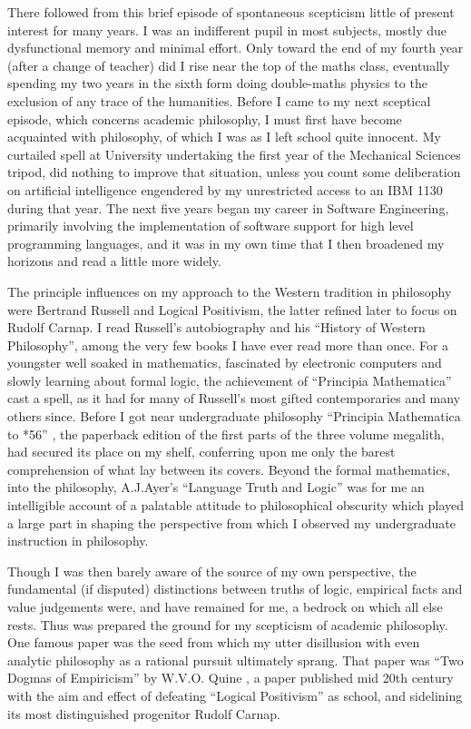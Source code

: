 \documentclass[10pt,titlepage]{book}
\begin{document}
There followed from this brief episode of spontaneous scepticism little of present interest for many years.
I was an indifferent pupil in most subjects, mostly due dysfunctional memory and minimal effort.
Only toward the end of my fourth year (after a change of teacher) did I rise near the top of the maths class, eventually spending my two years in the sixth form doing double-maths physics to the exclusion of any trace of the humanities.
Before I came to my next sceptical episode, which concerns academic philosophy, I must first have become acquainted with philosophy, of which I was as I left school quite innocent.
My curtailed spell at University undertaking the first year of the Mechanical Sciences tripod, did nothing to improve that situation, unless you count some deliberation on artificial intelligence engendered by my unrestricted access to an IBM 1130 during that year.
The next five years began my career in Software Engineering, primarily involving the implementation of software support for high level programming languages, and it was in my own time that I then broadened my horizons and read a little more widely.

The principle influences on my approach to the Western tradition in philosophy were Bertrand Russell and Logical Positivism, the latter refined later to focus on Rudolf Carnap.
I read Russell's autobiography and his ``History of Western Philosophy'', among the very few books I have ever read more than once.
For a youngster well soaked in mathematics, fascinated by electronic computers and slowly learning about formal logic, the achievement of ``Principia Mathematica'' cast a spell, as it had for many of Russell's most gifted contemporaries and many others since.
Before I got near undergraduate philosophy ``Principia Mathematica to *56'' \cite{russell1970}, the paperback edition of the first parts of the three volume megalith, had secured its place on my shelf, conferring upon me only the barest comprehension of what lay between its covers.
Beyond the formal mathematics, into the philosophy, A.J.Ayer's ``Language Truth and Logic'' \cite{ayer1936} was for me an intelligible account of a palatable attitude to philosophical obscurity which played a large part in shaping the perspective from which I observed my undergraduate instruction in philosophy.

Though I was then barely aware of the source of my own perspective, the fundamental (if disputed) distinctions between truths of logic,  empirical facts and value judgements were, and have remained for me, a bedrock on which all else rests.
Thus was prepared the ground for my scepticism of academic philosophy.
One famous paper was the seed from which my utter disillusion with even analytic philosophy as a rational pursuit ultimately sprang.
That paper was ``Two Dogmas of Empiricism'' by W.V.O. Quine \cite{quine51}, a paper published mid 20th century with the aim and effect of defeating ``Logical Positivism'' as school, and sidelining its most distinguished progenitor Rudolf Carnap.
\end{document}
